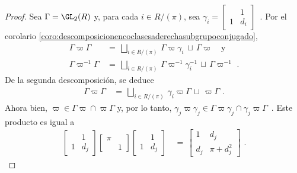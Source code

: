 \begin{proof}
	Sea $\Gamma=\GL_{2}(R)$ y, para cada $i\in R/(\pi)$, sea
	\begin{math}
		\gamma_{i}=\begin{bmatrix} & 1 \\ 1 & d_{i} \end{bmatrix}
	\end{math}~.
	Por el corolario
	\ref{coro:descomposicionencoclasesaderechasubgrupoconjugado},
	\begin{align*}
		\Gamma\varpi\Gamma & \,=\,\bigsqcup_{i\in R/(\pi)}\,
			\Gamma\varpi\gamma_{i}
				\,\sqcup\,\Gamma\varpi
			\quad\text{y} \\
		\Gamma\varpi^{-1}\Gamma & \,=\,\bigsqcup_{i\in R/(\pi)}\,
			\Gamma\varpi^{-1}\gamma_{i}^{-1}
				\,\sqcup\,\Gamma\varpi^{-1}
		\text{ .}
	\end{align*}
	De la segunda descomposici\'{o}n, se deduce
	\begin{align*}
		\Gamma\varpi\Gamma & \,=\,\bigsqcup_{i\in R/(\pi)}\,
			\gamma_{i}\varpi\Gamma
				\,\sqcup\,\varpi\Gamma
		\text{ .}
	\end{align*}
	Ahora bien, $\varpi\in\Gamma\varpi\cap\varpi\Gamma$ y, por lo tanto,
	\begin{math}
		\gamma_{j}\varpi\gamma_{j}\in\Gamma\varpi\gamma_{j}\cap
			\gamma_{j}\varpi\Gamma
	\end{math}~.
	Este producto es igual a
	\begin{align*}
		\begin{bmatrix} & 1 \\ 1 & d_{j} \end{bmatrix}
			\begin{bmatrix} \pi & \\ & 1 \end{bmatrix}
		\begin{bmatrix} & 1 \\ 1 & d_{j} \end{bmatrix} & \,=\,
			\begin{bmatrix} 1 & d_{j} \\
				d_{j} & \pi + d_{j}^{2}\end{bmatrix}
		\text{ .}
	\end{align*}
\end{proof}
